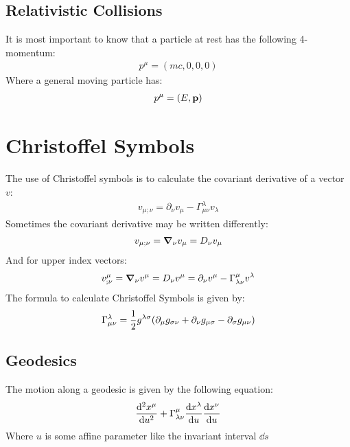 \documentclass[12pt]{article}
\newcommand{\D}{\partial}
\begin{document}
\subsection{Relativistic Collisions}
It is most important to know that a particle at rest has the following 4-momentum:
\begin{align*}
  p^\mu=(mc,0,0,0)
\end{align*}
Where a general moving particle has:
\begin{align*}
  p^\mu=(E,\vb{p})
\end{align*}

\section{Christoffel Symbols}
The use of Christoffel symbols is to calculate the covariant derivative of a vector $v$:
\begin{align*}
  v_{\mu;\nu}=\D_\nu v_\mu-\Gamma^\lambda_{\mu\nu}v_\lambda
\end{align*}
Sometimes the covariant derivative may be written differently:
\begin{align*}
  v_{\mu;\nu}=\grad_\nu{v_\mu}=D_\nu v_\mu
\end{align*}
And for upper index vectors:
\begin{align*}  
  v_{;\nu}^\mu=\grad_\nu{v^\mu}=D_\nu v^\mu=
  \D_\nu v^\mu-\Gamma^\mu_{\lambda\nu}v^\lambda
\end{align*}
The formula to calculate Christoffel Symbols is given by:
\begin{align*}
  \Gamma^\lambda_{\mu\nu}=\frac{1}{2}g^{\lambda\sigma}
  \qty(\D_\mu g_{\sigma\nu}+\D_\nu g_{\mu\sigma}-\D_\sigma g_{\mu\nu})
\end{align*}
\subsection{Geodesics}
The motion along a geodesic is given by the following equation:
\begin{align*}
  \dv[2]{x^\mu}{u}+\Gamma^\mu_{\lambda\nu}\dv{x^\lambda}{u}\dv{x^\nu}{u}
\end{align*}
Where $u$ is some affine parameter like the invariant interval $\dd{s}$
\end{document}
